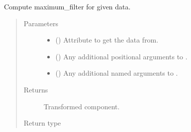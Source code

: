 \documentclass[letterpaper,10pt,english]{sphinxmanual}
\begin{document}
\begin{fulllineitems}
\begin{fulllineitems}
\label{\detokenize{api/base_classes:geology.src.base_spatial.SpatialComponent.maximum_filter}}
Compute maximum\_filter for given data.
\begin{quote}\begin{description}
\item[{Parameters}] \leavevmode\begin{itemize}
\item {} 
 (\sphinxstyleliteralemphasis{\sphinxupquote{, }}) \textendash{} Attribute to get the data from.

\item {} 
 () \textendash{} Any additional positional arguments to .

\item {} 
 () \textendash{} Any additional named arguments to .

\end{itemize}

\item[{Returns}] \leavevmode
{} \textendash{} Transformed component.

\item[{Return type}] \leavevmode
{\hyperref[\detokenize{api/base_classes:geology.src.base_spatial.SpatialComponent}]{}}

\end{description}\end{quote}

\end{fulllineitems}



\end{fulllineitems}
\end{document}
